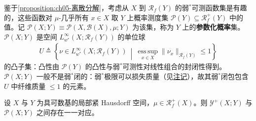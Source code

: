 \documentclass[../../main.tex]{subfiles}%
\begin{document}
鉴于\cref{proposition:ch05-离散分解}，考虑从 $X$ 到 $\mathscr{R}_f(Y)$ 的弱$^*$可测函数集是有趣的，这些函数对 $\mu$-几乎所有 $x\in X$ 取 $Y$ 上概率测度集 $\mathcal{P}(Y)\subseteq\mathscr{R}^+_f(Y)$ 中的值。记 $\mathcal{P}(X;Y)\equiv\mathcal{P}(X,\mathscr{B}(X),\mu;Y)$ 为该集，称为 $Y$ 上的\textbf{参数化概率}集。$\mathcal{P}(X;Y)$ 是空间 $L^\infty_{w^*}(X;\mathscr{R}_f(Y))$ 的单位球
\begin{align}
U\triangleq \left\{\nu\in L^\infty_{w^*}(X;\mathscr{R}_f(Y))\ \middle|\
\operatorname*{ess\,sup}_{x\in X}\|\nu_x\|_{\mathscr{R}_f(Y)}\leqslant1\right\}\label{align:ch05-5.55}
\end{align}
的凸子集：凸性由 $\mathcal{P}(Y)$ 的凸性与弱$^*$可测性对线性组合的封闭性得到。$\mathcal{P}(X;Y)$ 一般不是弱$^*$闭的：弱$^*$极限可以损失质量（见\hyperref[remark:ch05-弱星损失质量]{注记}），故其弱$^*$闭包包含 $U$ 中纤维质量 $\leqslant1$ 的元素。

\begin{corollary}\label{corollary:ch05-Young一一对应}
设 $X$ 与 $Y$ 为具可数基的局部紧 Hausdorff 空间，$\mu\in\mathscr{R}^+_f(X)$。则 $\mathcal{Y}^+(X;Y)$ 与 $\mathcal{P}(X;Y)$ 之间存在一一对应。
\end{corollary}
\end{document}
